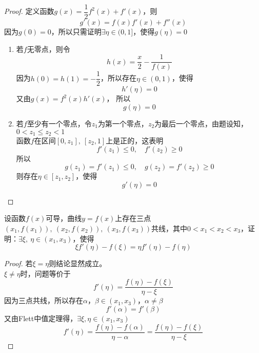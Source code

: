 \begin{proof}

    定义函数$g(x) = \dfrac{1}{2}f^2(x) + f'(x)$，则
    $$g'(x) = f(x) f'(x) + f''(x)$$
    因为$g(0) = 0$，所以只需证明$\exists \eta \in (0,1]$，使得$g(\eta) = 0$

    \begin{enumerate}

        \item 若$f$无零点，则令
            $$h(x) = \dfrac{x}{2} - \dfrac{1}{f(x)}$$
            因为$h(0) = h(1) = -\dfrac{1}{2}$，所以存在$\eta \in (0,1)$，使得
            $$h'(\eta) = 0$$
            又由$g(x) = f^2(x) h'(x)$，
            所以
            $$g(\eta) = 0$$

        \item 
            若$f$至少有一个零点，令$z_1$为第一个零点，$z_2$为最后一个零点，由题设知，$0 < z_1 \leq z_2 < 1$\\
            函数$f$在区间$[0,z_1],\ [z_2,1]$上是正的，这表明
            $$f'(z_1) \leq 0,\quad f'(z_2) \geq 0$$
            所以
            $$g(z_1) = f'(z_1) \leq 0, \quad g(z_2) = f'(z_2) \geq 0$$
            则存在$\eta \in [z_1,z_2]$，使得
            $$g'(\eta) = 0$$

    \end{enumerate}

\end{proof}

\begin{proposition}

    设函数$f(x)$可导，曲线$y = f(x)$上存在三点$(x_1,f(x_1)),\ (x_2,f(x_2)), \ (x_3,f(x_3))$共线，其中$0 < x_1 < x_2 < x_3$，证明：$\exists \xi,\  \eta \in (x_1,x_3)$，使得
    $$\xi f'(\eta) - f(\xi) = \eta f'(\eta) - f(\eta)$$

\end{proposition}

\begin{proof}

    若$\xi = \eta$则结论显然成立。\\
    $\xi \neq \eta$时，问题等价于
    $$ f'(\eta) = \dfrac{f(\eta) - f(\xi)}{\eta - \xi}$$
    因为三点共线，所以存在$\alpha$，$\beta \in (x_1, x_3)$，$\alpha \neq \beta$
    $$f'(\alpha) = f'(\beta)$$
    又由\textup{Flett}中值定理得，$\exists \xi,\eta \in (x_1,x_3)$
    $$f'(\eta) = \dfrac{f(\eta) - f(\alpha)}{\eta - \alpha} = \dfrac{f(\eta) - f(\xi)}{\eta - \xi}$$

\end{proof}


